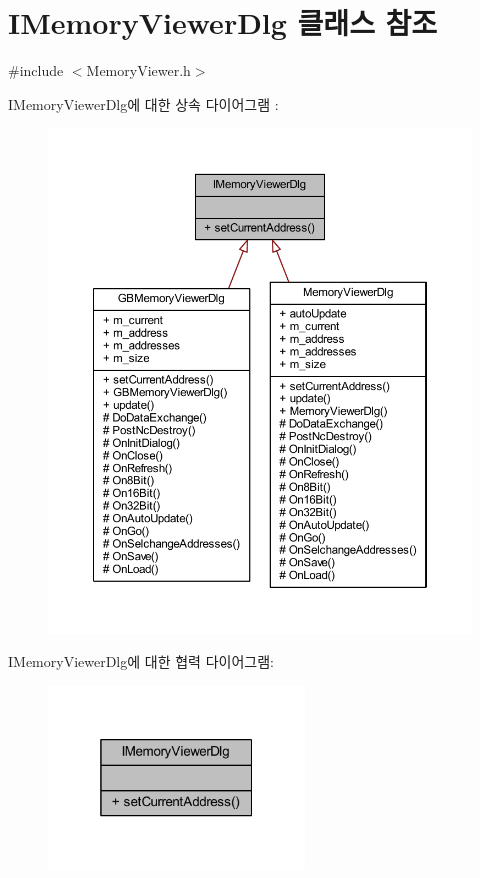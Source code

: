 \hypertarget{class_i_memory_viewer_dlg}{}\section{I\+Memory\+Viewer\+Dlg 클래스 참조}
\label{class_i_memory_viewer_dlg}


{\ttfamily \#include $<$Memory\+Viewer.\+h$>$}



I\+Memory\+Viewer\+Dlg에 대한 상속 다이어그램 \+: \nopagebreak
\begin{figure}[H]
\begin{center}
\leavevmode
\includegraphics[width=350pt]{class_i_memory_viewer_dlg__inherit__graph}
\end{center}
\end{figure}


I\+Memory\+Viewer\+Dlg에 대한 협력 다이어그램\+:\nopagebreak
\begin{figure}[H]
\begin{center}
\leavevmode
\includegraphics[width=193pt]{class_i_memory_viewer_dlg__coll__graph}
\end{center}
\end{figure}
